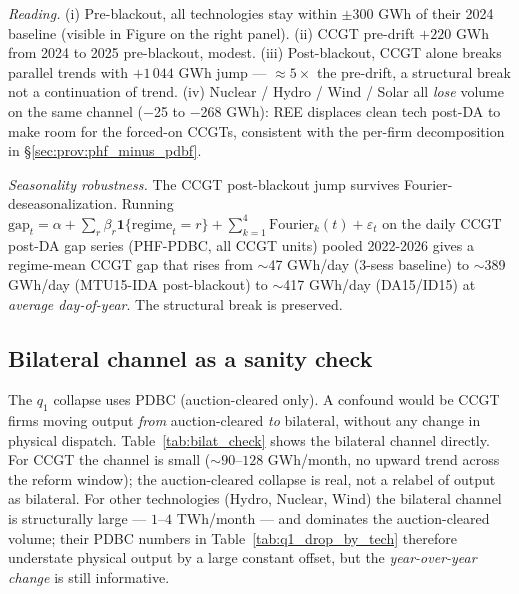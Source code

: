 \documentclass[11pt,a4paper]{article}
\begin{document}
\textit{Reading.} (i) Pre-blackout, all technologies stay within $\pm$300 GWh of their 2024 baseline (visible in Figure on the right panel). (ii) CCGT pre-drift $+220$ GWh from 2024 to 2025 pre-blackout, modest. (iii) Post-blackout, CCGT alone breaks parallel trends with $+1\,044$ GWh jump --- $\approx 5\times$ the pre-drift, a structural break not a continuation of trend. (iv) Nuclear / Hydro / Wind / Solar all \emph{lose} volume on the same channel ($-$25 to $-$268 GWh): REE displaces clean tech post-DA to make room for the forced-on CCGTs, consistent with the per-firm decomposition in \S\ref{sec:prov:phf_minus_pdbf}.

\textit{\color{seasoncol}Seasonality robustness.} The CCGT post-blackout jump survives Fourier-deseasonalization. Running $\text{gap}_t = \alpha + \sum_r \beta_r \mathbf{1}\{\text{regime}_t = r\} + \sum_{k=1}^{4} \text{Fourier}_k(t) + \varepsilon_t$ on the daily CCGT post-DA gap series (PHF-PDBC, all CCGT units) pooled 2022-2026 gives a regime-mean CCGT gap that rises from $\sim$47 GWh/day (3-sess baseline) to $\sim$389 GWh/day (MTU15-IDA post-blackout) to $\sim$417 GWh/day (DA15/ID15) at \emph{average day-of-year}. The structural break is preserved.

\subsection{Bilateral channel as a sanity check}\label{sec:prov:q1_drop:bilat}

The $q_1$ collapse uses PDBC (auction-cleared only). A confound would be CCGT firms moving output \emph{from} auction-cleared \emph{to} bilateral, without any change in physical dispatch. Table~\ref{tab:bilat_check} shows the bilateral channel directly. For CCGT the channel is small ($\sim 90$--$128$ GWh/month, no upward trend across the reform window); the auction-cleared collapse is real, not a relabel of output as bilateral. For other technologies (Hydro, Nuclear, Wind) the bilateral channel is structurally large --- $1$--$4$ TWh/month --- and dominates the auction-cleared volume; their PDBC numbers in Table~\ref{tab:q1_drop_by_tech} therefore understate physical output by a large constant offset, but the \emph{year-over-year change} is still informative.

\begin{table}[H]
\centering
\caption{\textbf{Bilateral channel by technology and regime, GWh / month.} \textbf{Programs: PDBF $-$ PDBC} (bilateral-contract executions reported by BRPs and folded into PDBF). Pivotal-firm aggregate. CCGT bilaterals are small and roughly stable; Hydro/Nuclear/Wind bilaterals are an order of magnitude larger and structurally part of their dispatch.}
\label{tab:bilat_check}
\setlength{\tabcolsep}{4pt}

\end{table}
\end{document}
